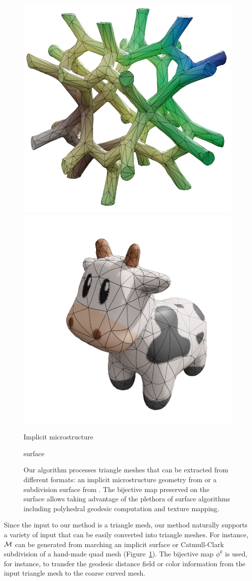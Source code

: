 \begin{figure}
    \centering\small
    \includegraphics[width=0.49\linewidth]{curve_meshing_in_shell_tex/figs/micro/color}\hfill
    \includegraphics[width=0.49\linewidth]{curve_meshing_in_shell_tex/figs/spot.png}\par
    \parbox{.49\linewidth}{\centering Implicit microstructure}\hfill
    \parbox{.49\linewidth}{ surface}
    \caption{Our algorithm processes triangle meshes that can be extracted from different formats: an implicit  microstructure geometry from \cite{tozoni2020low} or a subdivision surface from  \cite{crane2013conformal}. The bijective map preserved on the surface allows taking advantage of the plethora of surface algorithms including polyhedral geodesic computation \cite{mitchell1987discrete} and texture mapping.}
    \label{bichon:fig:flex}
\end{figure}

Since the input to our method is a triangle mesh, our method naturally supports a variety of input that can be easily converted into triangle meshes. For instance, $\mathcal{M}$ can be {generated from} marching an implicit surface or Catmull-Clark subdivision of a hand-made quad mesh (Figure~\ref{bichon:fig:flex}). The bijective map $\phi^k$ {is used}, for instance, to transfer the geodesic distance field or color information from the input triangle mesh to the coarse curved mesh.


